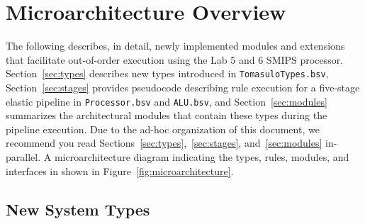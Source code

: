 \documentclass[12pt]{article}
\begin{document}
\section{Microarchitecture Overview}

The following describes, in detail, newly implemented modules and extensions
that facilitate out-of-order execution using the Lab 5 and 6 SMIPS processor.
Section~\ref{sec:types} describes new types introduced in
\verb=TomasuloTypes.bsv=, Section~\ref{sec:stages} provides pseudocode
describing rule execution for a five-stage elastic pipeline in
\verb=Processor.bsv= and \verb=ALU.bsv=, and Section~\ref{sec:modules}
summarizes the architectural modules that contain these types during the
pipeline execution. Due to the ad-hoc organization of this document, we
recommend you read Sections~\ref{sec:types},~\ref{sec:stages},
and~\ref{sec:modules} in-parallel. A microarchitecture diagram indicating the types, rules, modules, and interfaces in shown in Figure~\ref{fig:microarchitecture}.

\subsection{New System Types\label{sec:types}}
\end{document}
